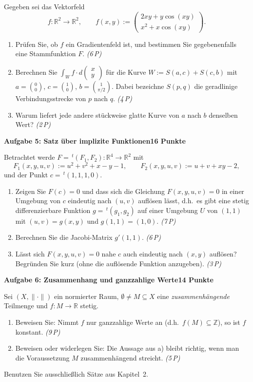 \documentclass[a4paper,12pt]{article}
\newcommand{\pkt}[1]{\hfill\textit{(#1\,P)}}
\newcommand{\aufgabe}[3]{%
  \bigskip\par\noindent\textbf{Aufgabe #1: #2}\hfill\textbf{#3 Punkte}%
  \par\nobreak\medskip}
\begin{document}
Gegeben sei das Vektorfeld
\[ f:\mathbb{R}^2\longrightarrow\mathbb{R}^2,\qquad
   f(x,y):=\begin{pmatrix} 2xy+y\cos(xy)\\ x^{2}+x\cos(xy)\end{pmatrix}. \]
\begin{enumerate}[label=\alph*)]
  \item Prüfen Sie, ob $f$ ein Gradientenfeld ist, und bestimmen Sie gegebenenfalls eine Stammfunktion $F$. \pkt{6}
  \item Berechnen Sie $\displaystyle\int_W f\cdot d\!\begin{pmatrix}x\\y\end{pmatrix}$ für die Kurve $W:=S(a,c)+S(c,b)$ mit
  $a=\binom{0}{0}$, $c=\binom{1}{0}$, $b=\binom{1}{\pi/2}$. Dabei bezeichne $S(p,q)$ die geradlinige Verbindungsstrecke von $p$ nach $q$. \pkt{4}
  \item Warum liefert jede andere stückweise glatte Kurve von $a$ nach $b$ denselben Wert? \pkt{2}
\end{enumerate}

\aufgabe{5}{Satz über implizite Funktionen}{16}

Betrachtet werde $F=\,^{t}(F_1,F_2):\mathbb{R}^4\to\mathbb{R}^2$ mit
\[ F_1(x,y,u,v):=u^2+v^2+x-y-1,\qquad F_2(x,y,u,v):=u+v+xy-2, \]
und der Punkt $c=\,^{t}(1,1,1,0)$.
\begin{enumerate}[label=\alph*)]
  \item Zeigen Sie $F(c)=0$ und dass sich die Gleichung $F(x,y,u,v)=0$ in einer Umgebung von $c$ eindeutig \glqq nach $(u,v)$ auflösen\grqq{} lässt, d.h.\ es gibt eine stetig differenzierbare Funktion $g=\,^{t}(g_1,g_2)$ auf einer Umgebung $U$ von $(1,1)$ mit $(u,v)=g(x,y)$ und $g(1,1)=(1,0)$. \pkt{7}
  \item Berechnen Sie die Jacobi-Matrix $g'(1,1)$. \pkt{6}
  \item Lässt sich $F(x,y,u,v)=0$ nahe $c$ auch eindeutig \glqq nach $(x,y)$ auflösen\grqq? Begründen Sie kurz (ohne die auflösende Funktion anzugeben). \pkt{3}
\end{enumerate}

\aufgabe{6}{Zusammenhang und ganzzahlige Werte}{14}

Sei $(X,\|\cdot\|)$ ein normierter Raum, $\emptyset\neq M\subseteq X$ eine
\emph{zusammenhängende} Teilmenge und $f:M\to\mathbb{R}$ stetig.
\begin{enumerate}[label=\alph*)]
  \item Beweisen Sie: Nimmt $f$ nur ganzzahlige Werte an (d.h.\ $f(M)\subseteq\mathbb{Z}$), so ist $f$ konstant. \pkt{9}
  \item Beweisen oder widerlegen Sie: Die Aussage aus a) bleibt richtig, wenn man die Voraussetzung \glqq $M$ zusammenhängend\grqq{} streicht. \pkt{5}
\end{enumerate}
Benutzen Sie ausschließlich Sätze aus Kapitel~2.
\end{document}
